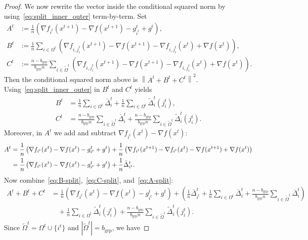 \documentclass{article}
\newcommand{\sqn}[1]{\left\| #1 \right\|^2}
\newcommand{\eqdef}{:=}
\theoremstyle{plain}
\begin{document}
\begin{proof}
We now rewrite the vector inside the conditional squared norm by using~\eqref{eq:split_inner_outer} term-by-term.
Set
\begin{align*}
A^t &\eqdef \frac{1}{n}\left(\nabla f_{i^t}(x^{t+1})-\nabla f(x^{t+1})-g_{i^t}^t+g^t\right),\\
B^t &\eqdef \frac{1}{n}\sum_{i\in\Omega^t}\left( \nabla f_{i,j_i^t}(x^{t+1})-\nabla f(x^{t+1})-\nabla f_{i,j_i^t}(x^{t})+\nabla f(x^{t})\right),\\
C^t &\eqdef \frac{n-b_{\mathrm{grp}}}{b_{\mathrm{grp}}n} \sum_{i\in \tilde{\Omega}^t}\left( \nabla f_{i,j_i^t}(x^{t+1})-\nabla f(x^{t+1})-\nabla f_{i,j_i^t}(x^{t})+\nabla f(x^{t})\right).
\end{align*}
Then the conditional squared norm above is $\sqn{A^t+B^t+C^t}$.
Using~\eqref{eq:split_inner_outer} in $B^t$ and $C^t$ yields
\begin{align}
B^t
&=\frac{1}{n}\sum_{i\in\Omega^t}\bar{\Delta}_i^t
+\frac{1}{n}\sum_{i\in\Omega^t}\widetilde{\Delta}_i^t(j_i^t),
\label{eq:B-split}\\
C^t
&=\frac{n-b_{\mathrm{grp}}}{b_{\mathrm{grp}}n}\sum_{i\in\tilde{\Omega}^t}\bar{\Delta}_i^t
+\frac{n-b_{\mathrm{grp}}}{b_{\mathrm{grp}}n}\sum_{i\in\tilde{\Omega}^t}\widetilde{\Delta}_i^t(j_i^t).
\label{eq:C-split}
\end{align}
Moreover, in $A^t$ we add and subtract $\nabla f_{i^t}(x^t)-\nabla f(x^t)$:
\begin{align}
A^t
&=\frac{1}{n}\left(\nabla f_{i^t}(x^{t})-\nabla f(x^{t})-g_{i^t}^t+g^t\right)
+\frac{1}{n}\left(\nabla f_{i^t}(x^{t+1})-\nabla f_{i^t}(x^{t})-\nabla f(x^{t+1})+\nabla f(x^{t})\right)\notag\\
&=\frac{1}{n}\left(\nabla f_{i^t}(x^{t})-\nabla f(x^{t})-g_{i^t}^t+g^t\right)
+\frac{1}{n}\bar{\Delta}_{i^t}^t.
\label{eq:A-split}
\end{align}
Now combine~\eqref{eq:B-split},~\eqref{eq:C-split}, and~\eqref{eq:A-split}:
\begin{align*}
A^t+B^t+C^t
&=\frac{1}{n}\left(\nabla f_{i^t}(x^{t})-\nabla f(x^{t})-g_{i^t}^t+g^t\right)
+\left(\frac{1}{n}\bar{\Delta}_{i^t}^t+\frac{1}{n}\sum_{i\in\Omega^t}\bar{\Delta}_i^t+\frac{n-b_{\mathrm{grp}}}{b_{\mathrm{grp}}n}\sum_{i\in\tilde{\Omega}^t}\bar{\Delta}_i^t\right)\\
&\quad+\frac{1}{n}\sum_{i\in\Omega^t}\widetilde{\Delta}_i^t(j_i^t)
+\frac{n-b_{\mathrm{grp}}}{b_{\mathrm{grp}}n}\sum_{i\in\tilde{\Omega}^t}\widetilde{\Delta}_i^t(j_i^t).
\end{align*}
Since $\tilde{\Omega}^t=\Omega^t\cup\{i^t\}$ and $|\tilde{\Omega}^t|=b_{\mathrm{grp}}$, we have

\end{proof}
\end{document}
